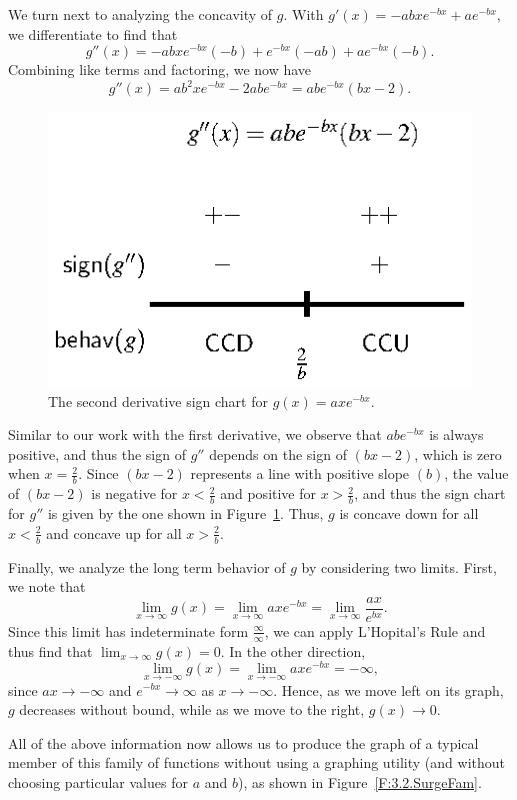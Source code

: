We turn next to analyzing the concavity of $g$.  With $g'(x) = -abxe^{-bx} + ae^{-bx}$, we differentiate to find that 
$$g''(x) = -abxe^{-bx}(-b) + e^{-bx}(-ab) + ae^{-bx}(-b).$$
Combining like terms and factoring, we now have
$$g''(x) = ab^2xe^{-bx} - 2abe^{-bx} = abe^{-bx}(bx - 2).$$
\begin{figure}[h]
\begin{center}
\includegraphics{figures/3_2_signchartg2.eps}
\caption{The second derivative sign chart for $g(x) = axe^{-bx}$.} \label{F:3.2.signchartg2}
\end{center}
\end{figure}
Similar to our work with the first derivative, we observe that $abe^{-bx}$ is always positive, and thus the sign of $g''$ depends on the sign of $(bx-2)$, which is zero when $x = \frac{2}{b}$.  Since $(bx-2)$ represents a line with positive slope $(b)$, the value of $(bx-2)$ is negative for $x < \frac{2}{b}$ and positive for $x > \frac{2}{b}$, and thus the sign chart for $g''$ is given by the one shown in Figure~\ref{F:3.2.signchartg2}.  Thus, $g$ is concave down for all $x < \frac{2}{b}$ and concave up for all $x > \frac{2}{b}$.

Finally, we analyze the long term behavior of $g$ by considering two limits.  First, we note that
$$\lim_{x \to \infty} g(x) = \lim_{x \to \infty} axe^{-bx} = \lim_{x \to \infty} \frac{ax}{e^{bx}}.$$
Since this limit has indeterminate form $\frac{\infty}{\infty}$, we can apply L'Hopital's Rule and thus find that $\lim_{x \to \infty} g(x) = 0$.  In the other direction,
$$\lim_{x \to -\infty} g(x) = \lim_{x \to -\infty} axe^{-bx} = -\infty,$$
since $ax \to -\infty$ and $e^{-bx} \to \infty$ as $x \to -\infty$.  Hence, as we move left on its graph, $g$ decreases without bound, while as we move to the right, $g(x) \to 0$.

All of the above information now allows us to produce the graph of a typical member of this family of functions without using a graphing utility (and without choosing particular values for $a$ and $b$), as shown in Figure~\ref{F:3.2.SurgeFam}.

